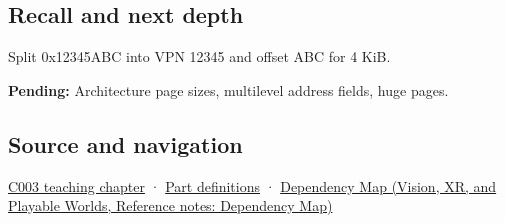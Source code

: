 \subsection{Recall and next depth}\label{appendix-0c67cd5bf30a-recall-and-next-depth}

Split 0x12345ABC into VPN 12345 and offset ABC for 4 KiB.

\textbf{Pending:} Architecture page sizes, multilevel address fields, huge pages.

\subsection{Source and navigation}\label{appendix-0c67cd5bf30a-source-and-navigation}

\hyperref[01-foundations-i-ch002-where-the-bytes-live]{C003 teaching chapter} · \hyperref[appendix-fd090d982a15-m003---parts-41-60]{Part definitions} · \href{../07-Vision-XR-and-Playable-Worlds/main.pdf\#nameddest=appendix-4ad47bdd269a}{Dependency Map (Vision, XR, and Playable Worlds, Reference notes: Dependency Map)}
